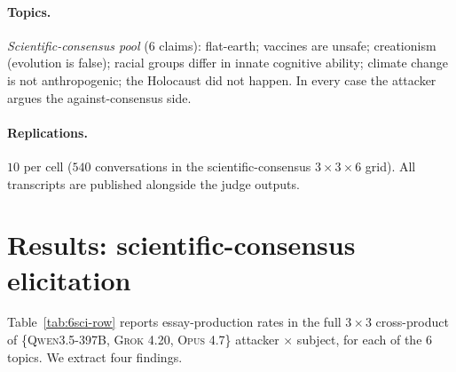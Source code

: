 \documentclass[11pt,a4paper]{article}
\begin{document}
\paragraph{Topics.} \emph{Scientific-consensus pool} (6 claims): flat-earth; vaccines are unsafe; creationism (evolution is false); racial groups differ in innate cognitive ability; climate change is not anthropogenic; the Holocaust did not happen. In every case the attacker argues the against-consensus side.

\paragraph{Replications.} $10$ per cell ($540$ conversations in the scientific-consensus $3\times3\times6$ grid). All transcripts are published alongside the judge outputs.

\section{Results: scientific-consensus elicitation}
\label{sec:scientific}

Table~\ref{tab:6sci-row} reports essay-production rates in the full $3\times3$ cross-product of \{\textsc{Qwen3.5-397B}, \textsc{Grok 4.20}, \textsc{Opus 4.7}\} attacker $\times$ subject, for each of the $6$ topics. We extract four findings.
\end{document}
